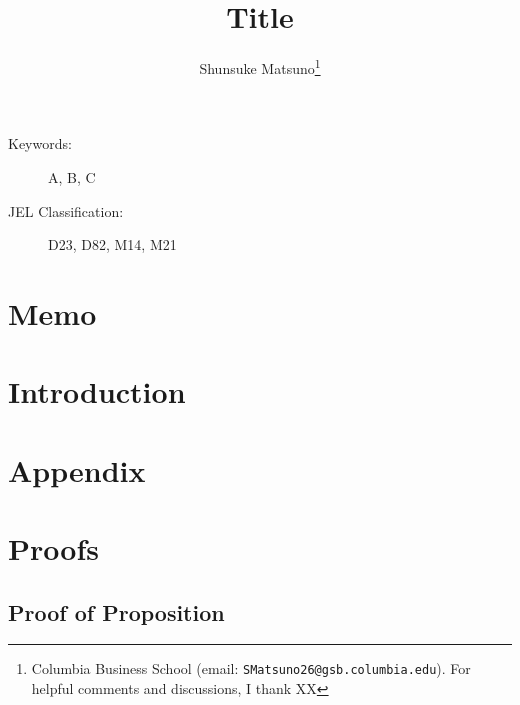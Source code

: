\documentclass[12pt]{article}
\title{Title}
\author{Shunsuke Matsuno\thanks{Columbia Business School (email: {\tt{SMatsuno26@gsb.columbia.edu}}).
For helpful comments and discussions, I thank XX }}
\begin{document}
\maketitle

\begin{abstract}
    \lipsum[1]
\end{abstract}


\begin{description}
    \item[Keywords:] A, B, C
    \item[JEL Classification:] D23, D82, M14, M21
\end{description}


\section*{Memo}

\clearpage
\section{Introduction}


\clearpage
%     
%     
\newpage
\appendix
\section*{\Large {Appendix}}
\section{Proofs} %
\subsection*{Proof of Proposition}
\end{document}
